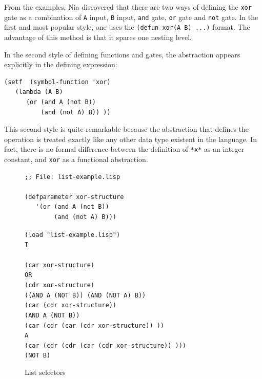 \documentclass[a4paper,12pt]{book}
\newenvironment{fmpage}[1]
           {\begin{lrbox}{\fmbox}\begin{minipage}{#1}}
           {\end{minipage}\end{lrbox}\fbox{\usebox{\fmbox}}}
\begin{document}
From the examples, Nia discovered that there are
two ways of defining the \verb|xor| gate as a
combination of \verb|A| input, \verb|B| input,
\verb|and| gate, \verb|or| gate and \verb|not| gate.
In the first and most popular style, one uses the
\verb|(defun xor(A B) ...)| format. The advantage of
this method is that it spares one nesting level. 

In the second style of defining functions and
gates, the abstraction appears explicitly in the
defining expression:
\label{page:lambda1}

\begin{verbatim}
(setf  (symbol-function 'xor)
   (lambda (A B)
      (or (and A (not B))
          (and (not A) B)) ))
\end{verbatim}

This second style is quite remarkable because
the abstraction that defines the operation
is treated exactly like any other
data type existent in the language.
In fact, there is no formal difference
between the definition of \verb|*x*|
as an integer constant, and \verb|xor|
as a functional abstraction.

\begin{figure}[!h]
\begin{fmpage}{0.8\linewidth}
\begin{verbatim}
;; File: list-example.lisp

(defparameter xor-structure
   '(or (and A (not B))
        (and (not A) B)))
\end{verbatim}
\end{fmpage}

\begin{fmpage}{0.8\linewidth}
\verb|(load "list-example.lisp")|\\
\verb|T|\\
\verb||\\
\verb|(car xor-structure)|  \\
\verb|OR|\\
\verb|(cdr xor-structure)|\\
\verb|((AND A (NOT B)) (AND (NOT A) B))|\\
\verb|(car (cdr xor-structure))|\\
\verb|(AND A (NOT B))|\\
\verb|(car (cdr (car (cdr xor-structure)) ))|\\
\verb|A|\\
\verb|(car (cdr (cdr (car (cdr xor-structure)) )))|\\
\verb|(NOT B)|
\end{fmpage}

\begin{fmpage}{0.8\linewidth}
\verb||
\end{fmpage}
\caption{List selectors}
\label{fig:selectors}
\end{figure}
\end{document}
